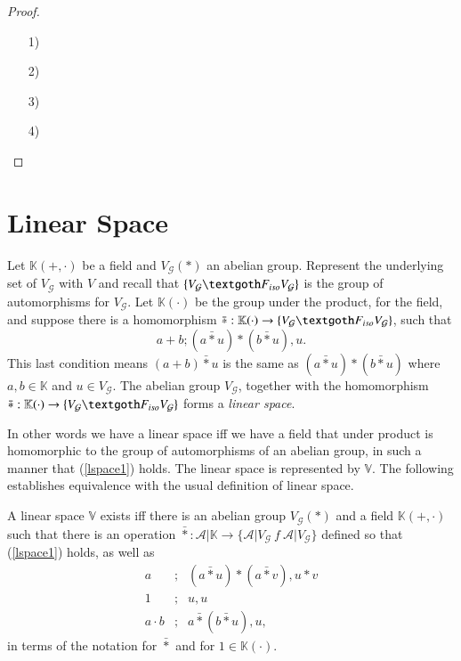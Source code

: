 \documentclass [12pt]{book}
\begin{document}
\begin{proof}\makebox[5pt][]{}\mbox {}

	\begin{itemize}

\item[1)]

\item[2)]

\item[3)]

\item[4)]

	\end{itemize}

\end{proof}

\chapter{Linear Space}

\begin{definition}Let $\mathbb K(+,\cdot)$ be a field and $V_\mathcal G(*)$ an abelian group. Represent the underlying set of $V_\mathcal G$ with $V$ and recall that $\{V_\mathcal G\textgoth F_{iso}V_\mathcal G\}$ is the group of automorphisms for $V_\mathcal G$. Let $\mathbb K(\cdot)$ be the group under the product, for the field, and suppose there is a homomorphism $\bar{*}:\mathbb K(\cdot)\rightarrow\{V_\mathcal G\textgoth F_{iso}V_\mathcal G\}$, such that \begin{equation}a+b;(a\bar{*}u)*(b\bar{*}u),u.\label{lspace1}\end{equation} This last condition means $(a+b)\bar{*}u$ is the same as $(a\bar{*}u)*(b\bar{*}u)$ where $a,b\in\mathbb K$ and $u\in V_\mathcal G$. The abelian group $V_\mathcal G$, together with the homomorphism $\bar{*}:\mathbb K(\cdot)\rightarrow\{V_\mathcal G\textgoth F_{iso}V_\mathcal G\}$ forms a \textit{linear space}. \end{definition}In other words we have  a linear space iff we have a field that under product is homomorphic to the group of automorphisms of an abelian group, in such a manner that (\ref{lspace1}) holds. The linear space is represented by $\mathbb V$. The following establishes equivalence with the usual definition of linear space.

\begin{proposition}A linear space $\mathbb V$ exists iff there is an abelian group $V_\mathcal G(*)$ and a field $\mathbb K(+,\cdot)$ such that there is an operation $\bar*:\mathcal{A|}\mathbb{K}\rightarrow\{\mathcal{A|}V_\mathcal G~f~\mathcal{A|}V_\mathcal G\}$ defined so that (\ref{lspace1}) holds, as well as\begin{eqnarray}a&;&(a\bar*u)*(a\bar*v),u*v\\1&;&u,u\\a\cdot b&;&a\bar*(b\bar*u),u,\end{eqnarray}in terms of the notation for $\bar*$ and for $1\in\mathbb K(\cdot)$.\end{proposition}
\end{document}
